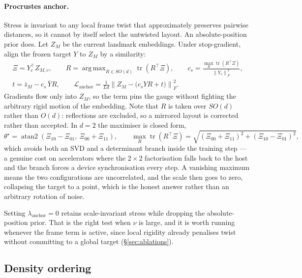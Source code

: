 \documentclass[12pt]{iopart}
\theoremstyle{definition}
\theoremstyle{plain}
\theoremstyle{remark}
\newcommand{\norm}[1]{\left\lVert#1\right\rVert}
\DeclareMathOperator*{\argmax}{arg\,max}
\DeclareMathOperator{\tr}{tr}
\newcommand{\loss}{\mathcal{L}}
\begin{document}
\paragraph{Procrustes anchor.}
Stress is invariant to any local frame twist that approximately preserves
pairwise distances, so it cannot by itself select the untwisted layout. An
absolute-position prior does. Let $Z_M$ be the current landmark embeddings.
Under stop-gradient, align the frozen target $Y$ to $Z_M$ by a similarity:
\begin{equation}
\label{eq:procrustes}
\begin{gathered}
\Xi = Y_c^\top Z_{M,c},
\qquad
R = \argmax_{R\in SO(d)}\tr(R^\top\Xi),
\qquad
c_s = \frac{\max_R\tr(R^\top\Xi)}{\norm{Y_c}_F^2},\\
t = \bar z_M - c_s\,\bar Y R,
\qquad
\loss_{\mathrm{anchor}}
=
\frac{1}{Ld}\norm{Z_M-\bigl(c_s YR+t\bigr)}_F^2 .
\end{gathered}
\end{equation}
Gradients flow only into $Z_M$, so the term pins the gauge without fighting the
arbitrary rigid motion of the embedding. Note that $R$ is taken over $SO(d)$
rather than $O(d)$: reflections are excluded, so a mirrored layout is
corrected rather than accepted. In $d=2$ the maximiser is closed form,
\begin{equation}
\label{eq:rot2d}
\theta^\star = \operatorname{atan2}(\Xi_{10}-\Xi_{01},\ \Xi_{00}+\Xi_{11}),
\qquad
\max_R\tr(R^\top\Xi)=\sqrt{(\Xi_{00}+\Xi_{11})^2+(\Xi_{10}-\Xi_{01})^2},
\end{equation}
which avoids both an SVD and a determinant branch inside the training step ---
a genuine cost on accelerators where the $2\times2$ factorisation falls back to
the host and the branch forces a device synchronisation every step. A vanishing
maximum means the two configurations are uncorrelated, and the scale then goes
to zero, collapsing the target to a point, which is the honest answer rather
than an arbitrary rotation of noise.

Setting $\lambda_{\mathrm{anchor}}=0$ retains scale-invariant stress while
dropping the absolute-position prior. That is the right test when $\nu$ is
large, and it is worth running whenever the frame term is active, since local
rigidity already penalises twist without committing to a global target
(\S\ref{sec:ablations}).

\subsection{Density ordering}
\label{sec:density}
\end{document}
